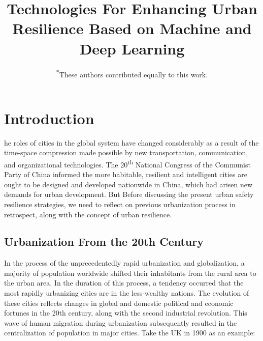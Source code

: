 \documentclass[conference]{IEEEtran}
\title{Technologies For Enhancing Urban Resilience Based on Machine and Deep Learning}
\author{
\IEEEauthorblockN{\textsuperscript{*}Nie Yanfeng}
\IEEEauthorblockA{\textit{School of Future Technology}}\and
\IEEEauthorblockN{\textsuperscript{*}Gong Yulin}
\IEEEauthorblockA{\textit{School of Future Technology}}\and
\IEEEauthorblockN{\textsuperscript{*}Zuo Hang}
\IEEEauthorblockA{\textit{School of Future Technology}}\linebreakand
\IEEEauthorblockN{\textsuperscript{*}Cheng Qian}
\IEEEauthorblockA{\textit{School of Future Technology}}\and
\IEEEauthorblockN{\textsuperscript{*}Jiang Sihang}
\IEEEauthorblockA{\textit{School of Future Technology}}\and
\IEEEauthorblockN{\textsuperscript{*}Li Lingjieling}
\IEEEauthorblockA{\textit{School of Future Technology}}\and
\IEEEauthorblockN{\textsuperscript{*}Yang Mohan}
\IEEEauthorblockA{\textit{School of Future Technology}}\and
{\footnotesize \textsuperscript{*}These authors contributed equally to this work.}
}
\begin{document}

\maketitle
\thispagestyle{plain}
\IEEEdisplaynontitleabstractindextext

\begin{group}
    \renewcommand\thefootnote{\fnsymbol{footnote}}
\end{group}

\section{\textbf{Introduction}}
he roles of cities in the global system have changed considerably as a result of the time-space compression made possible by new transportation, communication, and organizational technologies\cite{b1}. The 20\textsuperscript{th} National Congress of the Communist Party of China informed the more habitable, resilient and intelligent cities are ought to be designed and developed nationwide in China\cite{b2}, which had arisen new demands for urban development. But Before discussing the present urban safety resilience strategies, we need to reflect on previous urbanization process in retrospect, along with the concept of urban resilience.

\subsection{Urbanization From the 20th Century}
In the process of the unprecedentedly rapid urbanization and globalization, a majority of population worldwide shifted their inhabitants from the rural area to the urban area. In the duration of this process, a tendency occurred that the most rapidly urbanizing cities are in the less-wealthy nations\cite{b3}. The evolution of these cities reflects changes in global and domestic political and economic fortunes in the 20th century\cite{b4,b5,b6}, along with the second industrial revolution. This wave of human migration during urbanization subsequently resulted in the centralization of population in major cities. Take the UK in 1900 as an example:\cite{b7}
\end{document}
